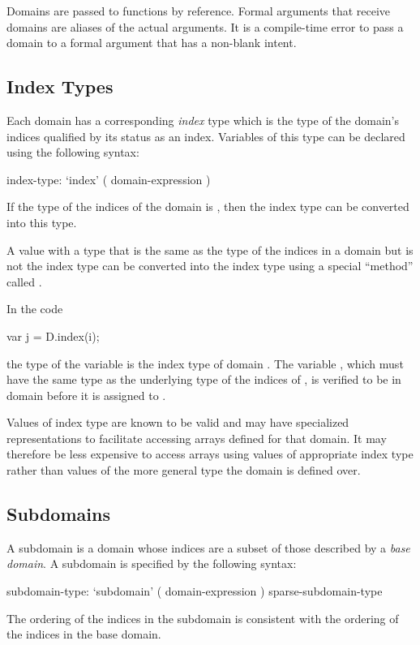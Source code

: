 Domains are passed to functions by reference.  Formal arguments that
receive domains are aliases of the actual arguments.  It is a
compile-time error to pass a domain to a formal argument that has a
non-blank intent.

\subsection{Index Types}
\label{Index_Types}

Each domain has a corresponding \emph{index} type which is the type of
the domain's indices qualified by its status as an index.  Variables
of this type can be declared using the following syntax:
\begin{syntax}
index-type:
  `index' ( domain-expression )
\end{syntax}
If the type of the indices of the domain is , then the index
type can be converted into this type.

A value with a type that is the same as the type of the indices in a
domain but is not the index type can be converted into the index type
using a special ``method'' called .

\begin{example}
In the code
\begin{chapel}
var j = D.index(i);
\end{chapel}
the type of the variable  is the index type of
domain .  The variable , which must have the same type
as the underlying type of the indices of , is verified to be
in domain  before it is assigned to .
\end{example}

Values of index type are known to be valid and may have specialized
representations to facilitate accessing arrays defined for that
domain. It may therefore be less expensive to access arrays using
values of appropriate index type rather than values of the more
general type the domain is defined over.

\subsection{Subdomains}
\label{Subdomains}

A subdomain is a domain whose indices are a subset of those described
by a \emph{base domain}.  A subdomain is specified by the following
syntax:
\begin{syntax}
subdomain-type:
  `subdomain' ( domain-expression )
  sparse-subdomain-type
\end{syntax}
The ordering of the indices in the subdomain is consistent with the
ordering of the indices in the base domain.

